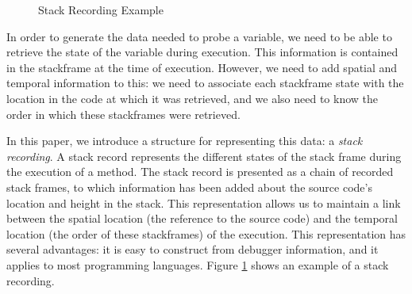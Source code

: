 \documentclass[english,submission]{programming}
\begin{document}
\begin{figure}[h]
\begin{minipage}{0.7\textwidth}
  \end{minipage}
  \caption{Stack Recording Example}
  \label{fig:stack-recording}
\end{figure}

In order to generate the data needed to probe a variable, we need to be able to retrieve the state of the variable during execution. 
This information is contained in the stackframe at the time of execution. 
However, we need to add spatial and temporal information to this: we need to associate each stackframe state with the location in the code at which it was retrieved, and we also need to know the order in which these stackframes were retrieved.

In this paper, we introduce a structure for representing this data: a \textit{stack recording}. 
A stack record represents the different states of the stack frame during the execution of a method. The stack record is presented as a chain of recorded stack frames, to which information has been added about the source code's location and height in the stack.
This representation allows us to maintain a link between the spatial location (the reference to the source code) and the temporal location (the order of these stackframes) of the execution.
This representation has several advantages: it is easy to construct from debugger information, and it applies to most programming languages.
Figure \ref*{fig:stack-recording} shows an example of a stack recording.
\end{document}
